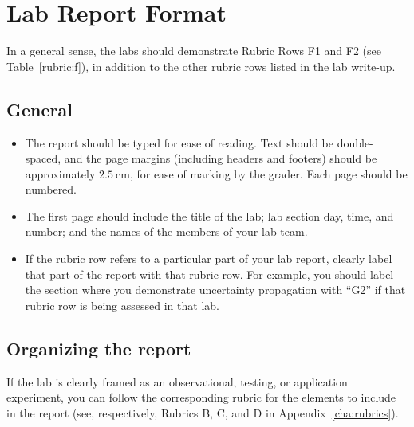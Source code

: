 \chapter{Lab Report Format}

In a general sense, the labs should demonstrate Rubric Rows F1 and F2 (see Table~\ref{rubric:f}), in addition to the other rubric rows listed in the lab write-up.

\section{General}

\begin{itemize}
	\item The report should be typed for ease of reading. Text should be double-spaced, and the page margins (including headers and footers) should be approximately $2.5\:$cm, for ease of marking by the grader. Each page should be numbered.
	
	\item The first page should include the title of the lab; lab section day, time, and number; and the names of the members of your lab team.
	
	\item If the rubric row refers to a particular part of your lab report, clearly label that part of the report with that rubric row. For example, you should label the section where you demonstrate uncertainty propagation with ``G2'' if that rubric row is being assessed in that lab.
\end{itemize}

\section{Organizing the report}

If the lab is clearly framed as an observational, testing, or application experiment, you can follow the corresponding rubric for the elements to include in the report (see, respectively, Rubrics B, C, and D in Appendix~\ref{cha:rubrics}).

